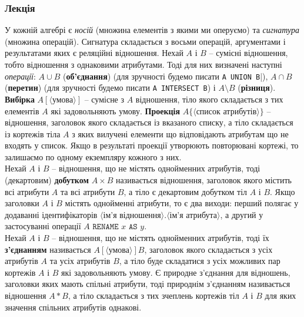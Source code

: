 \subsubsection{Лекція}
У кожній алгебрі є \textit{носій} (множина елементів з якими ми оперуємо) та \textit{сигнатура} (множина операцій). Сигнатура складається з восьми операцій, аргументами і результатами яких є реляційні відношення. Нехай $A$ і $B$ -- сумісні відношення, тобто відношення з однаковими атрибутами. Тоді для них визначені наступні \textit{операції}: $A\cup B$ (\textbf{об'єднання}) (для зручності будемо писати \verb|A UNION B||), $A\cap B$ (\textbf{перетин}) (для зручності будемо писати \verb|A INTERSECT B|) і $A\setminus B$ (\textbf{різниця}). \\

\textbf{Вибірка} $A[\langle\text{умова}\rangle]$ -- сумісне з $A$ відношення, тіло якого складається з тих елементів $A$ які задовольняють умову. \textbf{Проекція} $A\{\langle\text{список атрибутів}\rangle\}$ -- відношення, заголовок якого складається із вказаного списку, а тіло складається із кортежів тіла $A$ з яких вилучені елементи що відповідають атрибутам що не входять у список. Якщо в результаті проекції утворюють повторювані кортежі, то залишаємо по одному екземпляру кожного з них. \\ 

Нехай $A$ і $B$ -- відношення, що не містять однойменних атрибутів, тоді (декартовим) \textbf{добутком} $A\times B$ називається відношення, заголовок якого містить всі атрибути $A$ та всі атрибути $B$, а тіло є декартовим добутком тіл $A$ і $B$. Якщо заголовки $A$ і $B$ містять однойменні атрибути, то є два виходи: перший полягає у додаванні ідентифікаторів $\langle\text{ім'я відношення}\rangle.\langle\text{ім'я атрибута}\rangle$, а другий у застосуванні операції $A \texttt{ RENAME } x \texttt{ AS } y$.\\

Нехай $A$ і $B$ -- відношення, що не містять однойменних атрибутів, тоді їх \textbf{з'єднанням} називається $A[\langle\text{умова}\rangle]B$, заголовок якого складається з усіх атрибутів $A$ та усіх атрибутів $B$, а тіло буде складатися з усіх можливих пар кортежів $A$ і $B$ які задовольняють умову. Є природне з'єднання для відношень, заголовки яких мають спільні атрибути, тоді природнім з'єднанням називається відношення $A*B$, а тіло складається з тих зчеплень кортежів тіл $A$ і $B$ для яких значення спільних атрибутів однакові.\\

